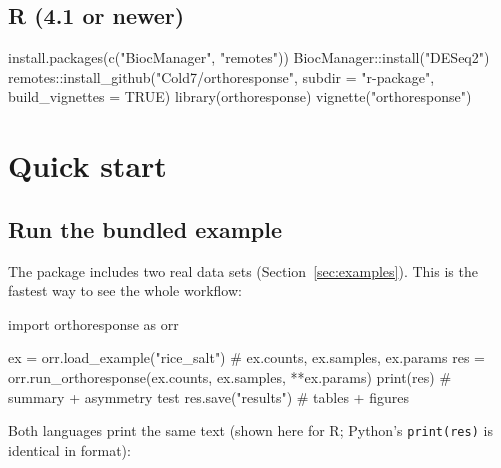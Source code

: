 \documentclass[11pt,a4paper]{article}
\newcommand{\code}[1]{\texttt{\color{navy!85!black}#1}}
\begin{document}
\subsection{R (4.1 or newer)}
\begin{rcode}
install.packages(c("BiocManager", "remotes"))
BiocManager::install("DESeq2")
remotes::install_github("Cold7/orthoresponse", subdir = "r-package",
                        build_vignettes = TRUE)
library(orthoresponse)
vignette("orthoresponse")
\end{rcode}

\section{Quick start}

\subsection{Run the bundled example}

The package includes two real data sets (Section~\ref{sec:examples}). This is the fastest way to see
the whole workflow:

\begin{pycode}
import orthoresponse as orr

ex = orr.load_example("rice_salt")            # ex.counts, ex.samples, ex.params
res = orr.run_orthoresponse(ex.counts, ex.samples, **ex.params)
print(res)                                    # summary + asymmetry test
res.save("results")                           # tables + figures
\end{pycode}


Both languages print the same text (shown here for R; Python's \code{print(res)} is identical
in format):
\end{document}
